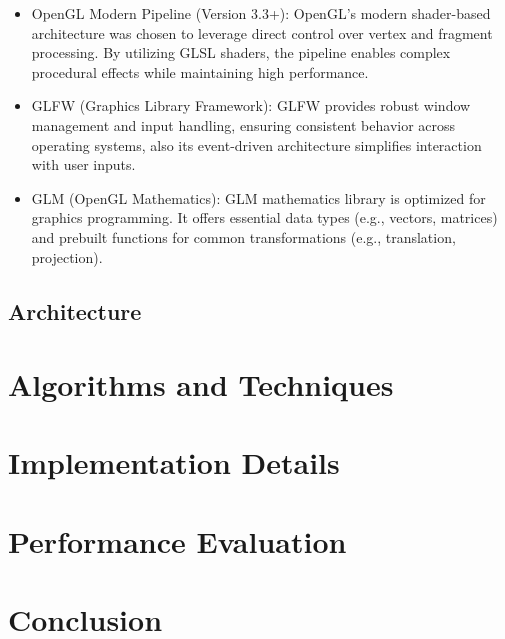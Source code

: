 \documentclass[12pt]{article}
\begin{document}
\begin{itemize}
\item OpenGL Modern Pipeline (Version 3.3+):
\newline
OpenGL’s modern shader-based architecture was chosen to leverage direct control over vertex and fragment processing. By utilizing GLSL shaders, the pipeline enables complex procedural effects while maintaining high performance.

\item GLFW (Graphics Library Framework):
\newline
GLFW provides robust window management and input handling, ensuring consistent behavior across operating systems, also its event-driven architecture simplifies interaction with user inputs.

\item GLM (OpenGL Mathematics):
\newline
GLM mathematics library is optimized for graphics programming. It offers essential data types (e.g., vectors, matrices) and prebuilt functions for common transformations (e.g., translation, projection).
\end{itemize}

\subsection{Architecture}

\newpage

\section{Algorithms and Techniques}
\label{sec:algorithms}

\newpage

\section{Implementation Details}
\label{sec:implementation}

\newpage

\section{Performance Evaluation}
\label{sec:performance}

\newpage

\section{Conclusion}
\label{sec:conclusion}

\end{document}
